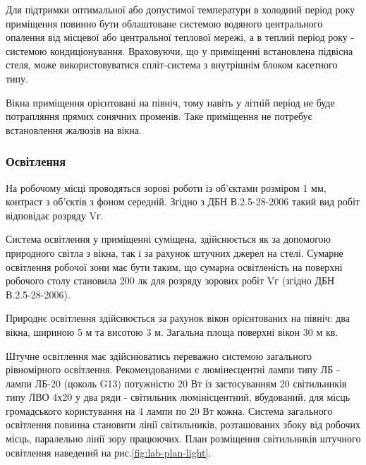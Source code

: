     Для підтримки оптимальної або допустимої температури в холодний період року приміщення повинно бути облаштоване системою водяного центрального опалення від місцевої або центральної теплової мережі, а в теплий період року - системою кондиціонування. Враховуючи, що у приміщенні встановлена підвісна стеля, може використовуватися спліт-система з внутрішнім блоком касетного типу.

    Вікна приміщення орієнтовані на північ, тому навіть у літній період не буде потрапляння прямих сонячних променів. Таке приміщення не потребує встановлення жалюзів на вікна.

    \subsubsection{Освітлення}

    На робочому місці проводяться зорові роботи із об'єктами розміром 1 мм, контраст з об'єктів з фоном середній. Згідно з ДБН В.2.5-28-2006\cite{lab-dbn28} такий вид робіт відповідає розряду Vг.

    Система освітлення у приміщенні суміщена, здійснюється як за допомогою природного світла з вікна, так і за рахунок штучних джерел на стелі. Сумарне освітлення робочої зони має бути таким, що сумарна освітленість на поверхні робочого столу становила 200 лк для розряду зорових робіт Vг (згідно ДБН В.2.5-28-2006\cite{lab-dbn28}).

    Природнє освітлення здійснюється за рахунок вікон орієнтованих на північ: два вікна, шириною 5 м та висотою 3 м. Загальна площа поверхні вікон 30 м кв.

    Штучне освітлення має здійснюватись переважно системою загального рівномірного освітлення. Рекомендованими є люмінесцентні лампи типу ЛБ - лампи ЛБ-20 (цоколь G13) потужністю 20 Вт із застосуванням 20 світильників типу ЛВО 4х20 у два ряди - світильник люмінісцентний, вбудований, для місць громадського користування на 4 лампи по 20 Вт кожна.
    Система загального освітлення повинна становити лінії світильників, розташованих збоку від робочих місць, паралельно лінії зору працюючих. План розміщення світильників штучного освітлення наведений на рис.\ref{fig:lab-plan-light}.

